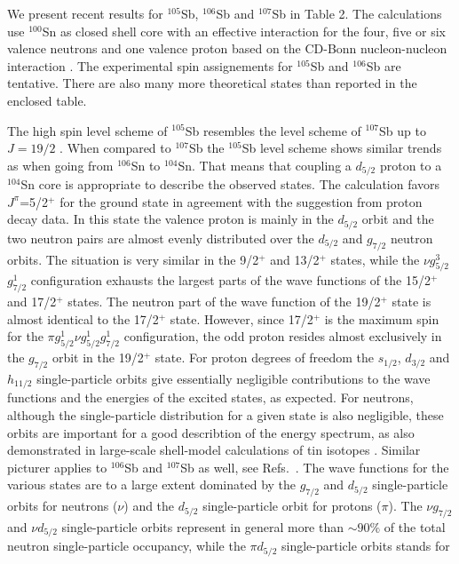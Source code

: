 \documentclass{ws-p8-50x6-00}
\begin{document}
We present recent results for $^{105}$Sb, $^{106}$Sb and $^{107}$Sb in
Table 2. The calculations use $^{100}$Sn as
closed shell core with an effective 
interaction for the four, five or six valence neutrons and one valence proton
based on the CD-Bonn nucleon-nucleon interaction \cite{ruprecht}.
The experimental spin assignements for $^{105}$Sb and
$^{106}$Sb are tentative. 
There are also many more theoretical states than 
reported in the enclosed table. 

The high spin level scheme of $^{105}$Sb resembles the level scheme of
$^{107}$Sb up to $J=19/2$ \cite{sb107}. 
When compared to $^{107}$Sb the $^{105}$Sb
level scheme shows similar trends as when going from $^{106}$Sn to
$^{104}$Sn. That means that coupling a $d_{5/2}$ proton to a 
$^{104}$Sn core is appropriate to describe the observed states.
The calculation favors $J^{\pi}$=5/2$^+$ for the ground state in
agreement with the suggestion from proton decay data.
In this state the valence proton is mainly in the $d_{5/2}$
orbit and the two neutron pairs are almost evenly distributed
over the $d_{5/2}$ and $g_{7/2}$ neutron orbits. The situation
is very similar in the 9/2$^+$ and 13/2$^+$ states, while 
the $\nu$$g_{5/2}^3$$g_{7/2}^1$ configuration exhausts the
largest parts of the wave functions of the 15/2$^+$ and 17/2$^+$ 
states. The neutron part of the wave function of the 19/2$^+$
state is almost identical to the 17/2$^+$ state. However,
since 17/2$^+$ is the maximum spin for the 
$\pi$$g_{5/2}^1$$\nu$$g_{5/2}^1$$g_{7/2}^1$ configuration,
the odd proton resides almost exclusively in the $g_{7/2}$
orbit in the 19/2$^+$ state. 
For proton degrees of freedom
the $s_{1/2}$, $d_{3/2}$ and $h_{11/2}$ single-particle 
orbits give essentially negligible
contributions to the wave functions and the energies of the excited
states, as expected. For neutrons, although
the single-particle distribution for a given state is also negligible,
these orbits are important for a good describtion of the energy spectrum,
as also demonstrated in large-scale shell-model calculations of
tin isotopes \cite{ehho98}.
Similar picturer applies to $^{106}$Sb and $^{107}$Sb as well, 
see Refs.~\cite{sb106,sb107}.
The wave functions for the various states are to a large extent
dominated by the $g_{7/2}$ and $d_{5/2}$ single-particle orbits
for neutrons ($\nu$)
and the $d_{5/2}$ single-particle
orbit for protons ($\pi$). 
The $\nu g_{7/2}$ and $\nu d_{5/2}$ single-particle orbits represent
in general more than $\sim 90\%$ of the total neutron single-particle
occupancy, while the  $\pi d_{5/2}$ single-particle orbits stands for 
\end{document}
